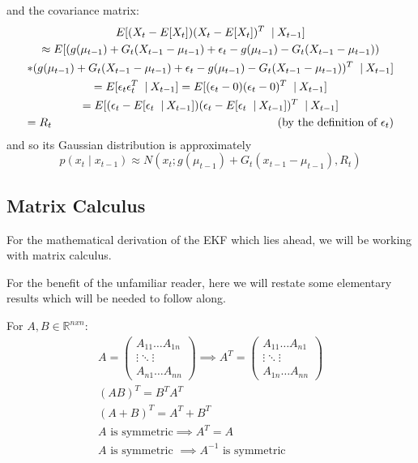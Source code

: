 and the covariance matrix:
\begin{multline*}
E[(X_t - E[X_t])(X_t - E[X_t])^T\ \mathbin{\vert} X_{t-1}] \\ \approx E[(g(\mu_{t-1}) + G_t (X_{t-1} - \mu_{t-1}) + \epsilon_t - g(\mu_{t-1}) - G_t (X_{t-1} - \mu_{t-1})) \\
* (g(\mu_{t-1}) + G_t (X_{t-1} - \mu_{t-1}) + \epsilon_t - g(\mu_{t-1}) - G_t (X_{t-1} - \mu_{t-1}))^T\ \mathbin{\vert} X_{t-1}] \\
= E[\epsilon_t \epsilon_t^T\ \mathbin{\vert} X_{t-1}] = E[(\epsilon_t - 0)(\epsilon_t - 0)^T\ \mathbin{\vert} X_{t-1}] \\
= E[(\epsilon_t - E[\epsilon_t\ \mathbin{\vert} X_{t-1}])(\epsilon_t - E[\epsilon_t\ \mathbin{\vert} X_{t-1}])^T\ \mathbin{\vert} X_{t-1}] \\
= R_t \hfill \text{(by the definition of \(\epsilon_t\))} \end{multline*}
and so its Gaussian distribution is approximately
\begin{equation} \label{eqStateTransitionNormalDef}
p(x_t \mathbin{\vert} x_{t-1}) \approx N(x_t;g(\mu_{t-1}) + G_t (x_{t-1} - \mu_{t-1}),R_t)
\end{equation}

\subsection{Matrix Calculus}
For the mathematical derivation of the EKF which lies ahead, we will be working with matrix calculus.

For the benefit of the unfamiliar reader, here we will restate some elementary results which will be needed to follow along.

For \(A,B \in \mathbb{R}^{nxn}\):
\begin{gather}
A = \begin{pmatrix}
A_{11}  \dots A_{1n} \\
\vdots  \ddots  \vdots \\
A_{n1} \dots  A_{nn}
\end{pmatrix}  \implies A^T = \begin{pmatrix}
A_{11}  \dots A_{n1} \\
\vdots  \ddots  \vdots  \\
A_{1n} \dots A_{nn}
\end{pmatrix} \\
(AB)^T = B^T A^T \\
(A+B)^T = A^T + B^T \\
A \text{ is symmetric} \implies A^T = A \\
A \text{ is symmetric } \implies A^{-1} \text{ is symmetric } 
\end{gather}

